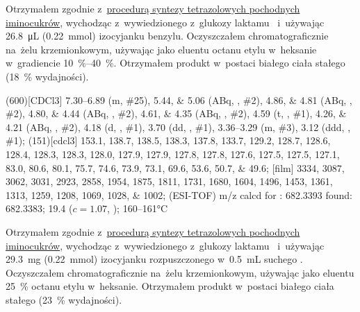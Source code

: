 Otrzymałem zgodnie z~\hyperref[experimental:sugars:schwartz]{procedurą syntezy tetrazolowych
	pochodnych iminocukrów}, wychodząc z~wywiedzionego z~glukozy laktamu~
	i~używając \SI{26.8}{\micro\liter} (\SI{0.22}{\milli\mol}) izocyjanku benzylu.
Oczyszczałem chromatograficznie na~żelu krzemionkowym,
	używając jako eluentu octanu etylu w~heksanie w~gradiencie \SIrange{10}{40}{\percent}.
Otrzymałem produkt w~postaci białego ciała stałego (\SI{18}{\percent} wydajności).

\begin{fullexp}
	\NMR(600)[CDCl3] \numrange{7.30}{6.89} (m, \#{25}), \numlist{5.44;5.06} (ABq, , \#{2}), \numlist{4.86;4.81} (ABq, , \#{2}), \numlist{4.80;4.44} (ABq, , \#{2}), \numlist{4.61;4.35} (ABq, , \#{2}), \num{4.59} (t, , \#{1}), \numlist{4.26;4.21} (ABq, , \#{2}), \num{4.18} (d, , \#{1}), \num{3.70} (dd, , \#{1}), \numrange{3.36}{3.29} (m, \#{3}), \num{3.12} (ddd, , \#{1});
	(151)[cdcl3] \numlist{153.1; 138.7; 138.5; 138.3; 137.8; 133.7; 129.2; 128.7; 128.6; 128.4; 128.3; 128.3; 128.0; 127.9; 127.9; 127.8; 127.8; 127.6; 127.5; 127.5; 127.1; 83.0; 80.6; 80.1; 75.7; 74.6; 73.9; 73.1; 69.6; 53.6; 50.7; 49.6};
	[film] \numlist{3334; 3087; 3062; 3031; 2923; 2858; 1954; 1875; 1811; 1731; 1680; 1604; 1496; 1453; 1361; 1313; 1259; 1208; 1069; 1028; 1002};
	 (ESI-TOF) m/z calcd for : \num{682.3393} found: \num{682.3383};
	\data{[$\alpha^{23}_D$]~$=$} \num{19.4} ($c = 1.07$, );
	 \numrange{160}{161}\si{\celsius}
\end{fullexp}

Otrzymałem zgodnie z~\hyperref[experimental:sugars:schwartz]{procedurą syntezy tetrazolowych
	pochodnych iminocukrów}, wychodząc z~wywiedzionego z~glukozy laktamu~
	i~używając \SI{29.3}{\milli\gram} (\SI{0.22}{\milli\mol}) izocyjanku 
	rozpuszczonego w~\SI{0.5}{\milli\liter} suchego .
Oczyszczałem chromatograficznie na~żelu krzemionkowym,
	używając jako eluentu \SI{25}{\percent} octanu etylu w~heksanie.
Otrzymałem produkt w~postaci białego ciała stałego (\SI{23}{\percent} wydajności).


